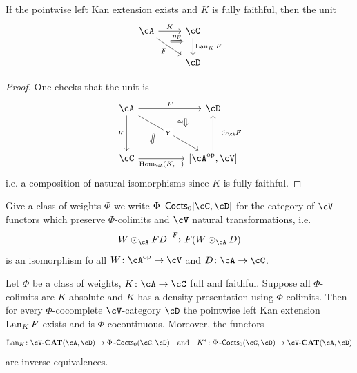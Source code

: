 \documentclass[a4paper,11pt,oneside,openany]{scrbook}
\begin{document}
\begin{lemma}
    If the pointwise left Kan extension exists and $ K $ is fully faithful, then the unit
    \begin{displaymath}
        \begin{tikzcd}
	    \cA \arrow[r, "K"]\arrow[rd,"F"', 	""{name=F,marking,near start}] 	 &
	    \cC \arrow[d, "{\Lan_K F}",		""{name=L,marking,above, near start}]	\\
	    & \cD
	    \arrow[Rightarrow, from=F, to=L, shorten <=10pt, shorten >=10pt, start anchor={north west}, end anchor={[yshift=1pt]}, "\eta_F"]
        \end{tikzcd}
    \end{displaymath}
\end{lemma}
\begin{proof}
    One checks that the unit is
    \begin{displaymath}
	\begin{tikzcd}[column sep = huge, row sep =huge]
            \cA
	    \arrow[r,"F", ""{name=F, near end}]
	    \arrow[d,"K"']
	    \arrow[rd, "Y"description, ""{name=Y, near end}, ""{name=Z, near start}]
	    &
	    \cD
	    \\
	    \cC
	    \arrow[r, "{\Hom_{\cA}(K,-)}"', ""{name=H, near start}]
	    &
	    \lbrack\cA^{\op},\cV\rbrack
	    \arrow[u, "-\odot_\cA F"']
	    \arrow[Rightarrow, from =F, to=Y, shorten <= 10pt, shorten >=10pt, "\iso"']
	    \arrow[Rightarrow, from =Z, to=H, shorten <= 10pt, shorten >=10pt]
        \end{tikzcd}
    \end{displaymath}
    i.e. a composition of natural isomorphisms since $ K $ is fully faithful.
\end{proof}
\begin{defn}
    Give a class of weights $ \Phi $ we write $ \Phi\Cocts_0[\cC,\cD] $ for the category of $ \cV $-functors which preserve $ \Phi $-colimits and $ \cV $ natural transformations, i.e.
    \begin{displaymath}
	W\odot _\cA FD \xrightarrow{F}  F(W\odot_\cA D)
    \end{displaymath}
    is an isomorphism fo all $ W \from \cA ^{\op} \to \cV $ and $ D \from \cA \to \cC $.
\end{defn}
\begin{thm}
    Let $ \Phi $ be a class of weights, $ K \from \cA \to \cC $ full and faithful.
    Suppose all $ \Phi $-colimits are $ K $-absolute and $ K $ has a density presentation using $ \Phi $-colimits.
    Then for every $ \Phi $-cocomplete $ \cV $-category $ \cD $ the pointwise left Kan extension $ \operatorname{Lan}_K F $ exists and is $ \Phi $-cocontinuous.
    Moreover, the functors
    \begin{displaymath}
	\Lan_K \from \cV\text{-}\CAT(\cA,\cD) \to \Phi\Cocts_0(\cC,\cD) \quad \text{and} \quad K^*\from \Phi\Cocts_0(\cC,\cD) \to \cV\text{-}\CAT(\cA,\cD)
    \end{displaymath}
    are inverse equivalences.
\end{thm}
\end{document}
